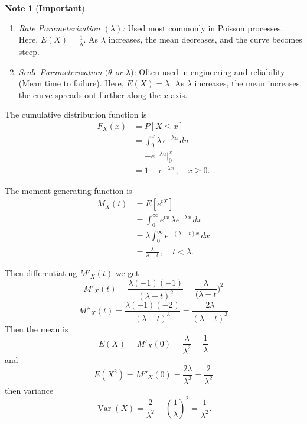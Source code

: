 \documentclass[12pt,a4paper]{report}
\theoremstyle{definition}
\newtheorem{note}[thm]{Note}
\theoremstyle{plain}
\theoremstyle{definition}
\begin{document}
\begin{note}[\textbf{Important}]
\textbf{ }
\begin{enumerate}
\item \textit{Rate Parameterization $(\lambda)$:} Used most commonly in Poisson processes. Here, $E(X) = \frac{1}{\lambda}$. As $\lambda$ increases, the mean decreases, and the curve becomes steep.
\item \textit{Scale Parameterization $(\theta$ or $\lambda)$:} Often used in engineering and reliability (Mean time to failure). Here, $E(X) = \lambda$. As $\lambda$ increases, the mean increases, the curve spreads out further along the $x$-axis. 
\end{enumerate}
\end{note}




The cumulative distribution function is
\begin{align*}
F_X(x) & = P[X \leq x]\\
& = \int^x_0 \lambda \, e^{-\lambda u}\, du\\
& = -e^{-\lambda u}\Big|^x_0\\
& = 1 - e^{-\lambda x}\, , \quad x \geq 0.
\end{align*}


The moment generating function is 
\begin{align*}
M_X(t) & = E\left[e^{tX}\right]\\
& = \int^{\infty}_0 e^{tx}\, \lambda e^{-\lambda x}\, dx\\
& = \lambda \int^{\infty}_0 e^{-(\lambda - t)x}\, dx\\
& = \frac{\lambda}{\lambda - t}\,,  \quad t < \lambda.
\end{align*}

Then differentiating $M'_X(t)$ we get
\[M'_X(t) = \frac{\lambda (-1) (-1)}{(\lambda - t)^2} = \frac{\lambda}{(\lambda - t})^2\]
\[M''_X(t) = \frac{\lambda (-1)(-2)}{(\lambda - t)^3} = \frac{2\lambda}{(\lambda - t)^3}\]
Then the mean is 
\[E(X) = M'_X(0) = \frac{\lambda}{\lambda^2} = \frac{1}{\lambda}\]
and 
\[E(X^2) = M''_X(0) = \frac{2\lambda}{\lambda^3} = \frac{2}{\lambda^2}\]
then variance
\[\operatorname{Var}(X) = \frac{2}{\lambda^2}-\left(\frac{1}{\lambda}\right)^2 = \frac{1}{\lambda^2}.\]
\end{document}
